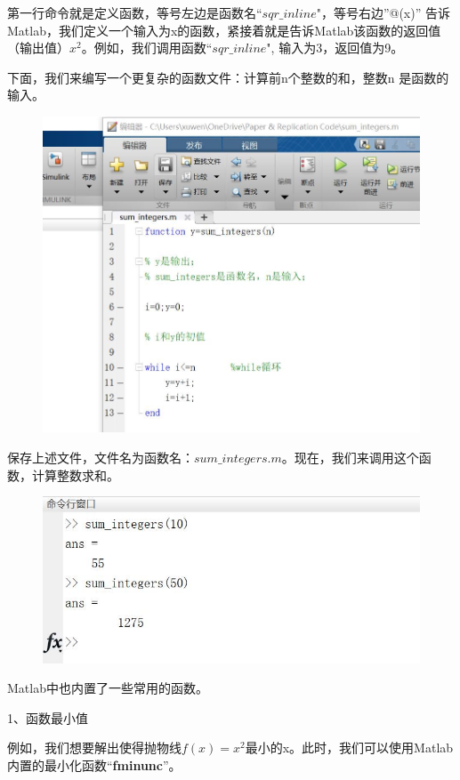 \documentclass[cn,10pt,math=newtx,citestyle=gb7714-2015,bibstyle=gb7714-2015]{elegantbook}
\begin{document}
{{	第一行命令就是定义函数，等号左边是函数名“$sqr\_inline$"，等号右边”@(x)” 告诉Matlab，我们定义一个输入为x的函数，紧接着就是告诉Matlab该函数的返回值（输出值）$x^2$。例如，我们调用函数“$sqr\_inline$", 输入为3，返回值为9。
	
	下面，我们来编写一个更复杂的函数文件：计算前n个整数的和，整数n 是函数的输入。
	
	\begin{figure}[htbp!]
		\centering
		\includegraphics[width=0.8\linewidth]{FIG/sumintegers}
		\centering
	\end{figure}
	
	保存上述文件，文件名为函数名：$sum\_integers.m$。现在，我们来调用这个函数，计算整数求和。
	
	\begin{figure}[htbp!]
		\centering
		\includegraphics[width=0.8\linewidth]{FIG/sumintegersresults}
		\centering
	\end{figure}
	
	Matlab中也内置了一些常用的函数。
	
	1、函数最小值
	
	例如，我们想要解出使得抛物线$f(x)=x^2$最小的x。此时，我们可以使用Matlab 内置的最小化函数“\textbf{fminunc}”。
	
}}
\end{document}
